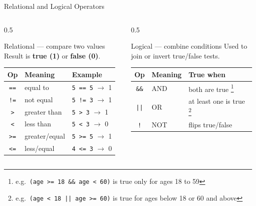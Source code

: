 \documentclass[aspectratio=169]{beamer}
\begin{document}
	\begin{frame}{Relational and Logical Operators}
		\begin{columns}[T]
			\begin{column}{0.5\textwidth}
				\begin{block}{Relational --- compare two values}
					\small Result is \textbf{true (1)} or \textbf{false (0)}.
				\end{block}
				\renewcommand{\arraystretch}{1.25}
				\centering
				\begin{tabular}{@{}cll@{}}
					\toprule
					\textbf{Op} & \textbf{Meaning} & \textbf{Example} \\
					\midrule
					\texttt{==} & equal to        & \texttt{5 == 5} $\rightarrow$ 1 \\
					\texttt{!=} & not equal       & \texttt{5 != 3} $\rightarrow$ 1 \\
					\texttt{>}  & greater than    & \texttt{5 > 3}  $\rightarrow$ 1 \\
					\texttt{<}  & less than       & \texttt{5 < 3}  $\rightarrow$ 0 \\
					\texttt{>=} & greater/equal   & \texttt{5 >= 5} $\rightarrow$ 1 \\
					\texttt{<=} & less/equal      & \texttt{4 <= 3} $\rightarrow$ 0 \\
					\bottomrule
				\end{tabular}
			\end{column}
			\begin{column}{0.5\textwidth}
				\begin{block}{Logical --- combine conditions}
					\small Used to join or invert true/false tests.
				\end{block}
				\renewcommand{\arraystretch}{1.25}
				\centering
				\begin{tabular}{@{}cll@{}}
					\toprule
					\textbf{Op} & \textbf{Meaning} & \textbf{True when} \\
					\midrule
					\texttt{\&\&} & AND & both are true \footnote{e.g.\ \texttt{(age >= 18 \&\& age < 60)} is true only for ages 18 to 59} \\
					\texttt{||}   & OR  & at least one is true \footnote{e.g.\ \texttt{(age < 18 || age >= 60)} is true for ages below 18 or 60 and above} \\
					\texttt{!}    & NOT & flips true/false \\
					\bottomrule
				\end{tabular}
				\vspace{0.2cm}
				\footnotesize 
			\end{column}
		\end{columns}
	\end{frame}
	
\end{document}
